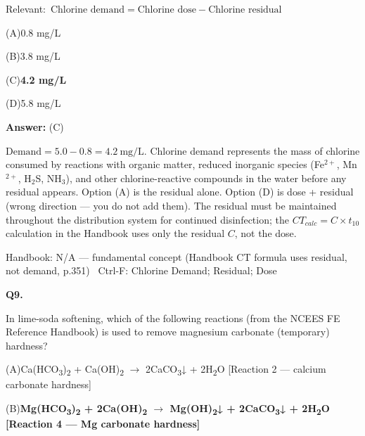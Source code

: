 \documentclass[11pt]{article}
\newcommand{\correct}[1]{\textbf{#1}\;{\color{accent}$\checkmark$}}
\newcommand{\optline}[2]{\par\noindent\hspace{1.2em}(#1)\hspace{0.6em}#2}
\begin{document}
{\small\color{soft}Relevant:}\ $\text{Chlorine demand} = \text{Chlorine dose} - \text{Chlorine residual}$\par\vspace{3pt}
\optline{A}{0.8 mg/L}
\optline{B}{3.8 mg/L}
\optline{C}{\correct{4.2 mg/L}}
\optline{D}{5.8 mg/L}
\par\vspace{3pt}
\vspace{2pt}\par\noindent\colorbox{boxbg}{\parbox{\dimexpr\linewidth-2\fboxsep\relax}{%
\vspace{2pt}\textbf{Answer:} (C)\par\vspace{2pt}
{\small $\text{Demand} = 5.0 - 0.8 = 4.2\ \mathrm{mg/L}$. Chlorine demand represents the mass of chlorine consumed by reactions with organic matter, reduced inorganic species (Fe$^{2+}$, Mn$^{2+}$, H$_2$S, NH$_3$), and other chlorine-reactive compounds in the water before any residual appears. Option (A) is the residual alone. Option (D) is dose + residual (wrong direction --- you do not add them). The residual must be maintained throughout the distribution system for continued disinfection; the $CT_{calc} = C\times t_{10}$ calculation in the Handbook uses only the residual $C$, not the dose.}\par\vspace{2pt}
{\footnotesize\color{soft}Handbook: N/A --- fundamental concept (Handbook CT formula uses residual, not demand, p.351) \textbullet\ Ctrl-F: Chlorine Demand; Residual; Dose}\vspace{2pt}
}}
\vspace{9pt}
\filbreak
\textbf{\color{accent}Q9.}\par\vspace{2pt}
In lime-soda softening, which of the following reactions (from the NCEES FE Reference Handbook) is used to remove magnesium carbonate (temporary) hardness?\par\vspace{3pt}
\optline{A}{Ca(HCO\textsubscript{3})\textsubscript{2} + Ca(OH)\textsubscript{2} $\rightarrow$ 2CaCO\textsubscript{3}↓ + 2H\textsubscript{2}O  [Reaction 2 --- calcium carbonate hardness]}
\optline{B}{\correct{Mg(HCO\textsubscript{3})\textsubscript{2} + 2Ca(OH)\textsubscript{2} $\rightarrow$ Mg(OH)\textsubscript{2}↓ + 2CaCO\textsubscript{3}↓ + 2H\textsubscript{2}O  [Reaction 4 --- Mg carbonate hardness]}}
\end{document}
